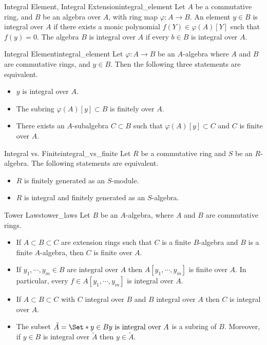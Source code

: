 \documentclass{article}
\begin{document}
\begin{definition}{Integral Element, Integral Extension}{integral_element}
    Let $A$ be a commutative ring, and $B$ be an algebra over $A$, with ring map $\varphi:A\rightarrow B$.
    An element $y\in B$ is integral over $A$ if there exists a monic polynomial $f(Y)\in \varphi(A)[Y]$ such that $f(y) = 0$.
    The algebra $B$ is integral over $A$ if every $b\in B$ is integral over $A$.
\end{definition}

\begin{proposition}{Integral Element}{integral_element}
    Let $\varphi:A\rightarrow B$ be an $A$-algebra where $A$ and $B$ are commutative rings, and $y\in B$.
    Then the following three statements are equivalent.
    \begin{itemize}
        \item $y$ is integral over $A$.
        \item The subring $\varphi(A)[y]\subset B$ is finitely over $A$.
        \item There exists an $A$-subalgebra $C\subset B$ such that $\varphi(A)[y]\subset C$ and $C$ is finite over $A$.
    \end{itemize}
\end{proposition}

\begin{theorem}{Integral vs. Finite}{integral_vs_finite}
    Let $R$ be a commutative ring and $S$ be an $R$-algebra.
    The following statements are equivalent.
    \begin{itemize}
        \item $R$ is finitely generated as an $S$-module.
        \item $R$ is integral and finitely generated as an $S$-algebra.
    \end{itemize}
\end{theorem}

\begin{proposition}{Tower Laws}{tower_laws}
    Let $B$ be an $A$-algebra, where $A$ and $B$ are commutative rings.
    \begin{itemize}
        \item If $A\subset B\subset C$ are extension rings such that $C$ is a finite $B$-algebra and $B$ is a finite $A$-algebra, then $C$ is finite over $A$.
        \item If $y_1,\cdots,y_m\in B$ are integral over $A$ then $A[y_1,\cdots,y_m]$ is finite over $A$.
        In particular, every $f\in A[y_1,\cdots,y_m]$ is integral over $A$.
        \item If $A\subset B\subset C$ with $C$ integral over $B$ and $B$ integral over $A$ then $C$ is integral over $A$.
        \item The subset $\tilde{A} = \Set*{y\in B}{y \text{ is integral over }A}$ is a subring of $B$.
        Moreover, if $y\in B$ is integral over $\tilde{A}$ then $y\in \tilde{A}$.
    \end{itemize}
\end{proposition}
\end{document}

